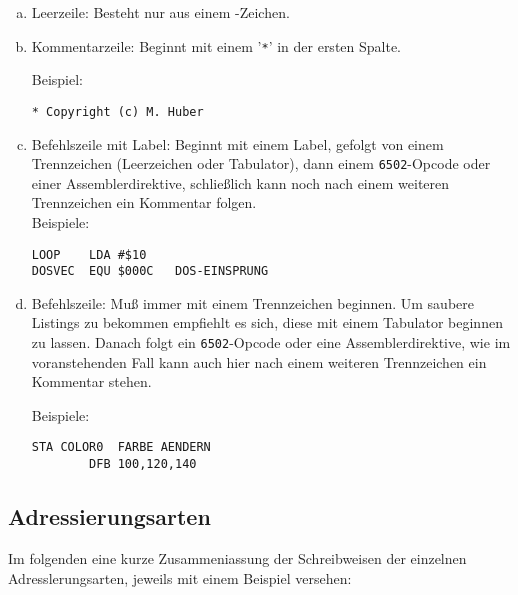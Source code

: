 \documentclass[10pt,a4paper,twoside,final,openright,titlepage]{memoir}
\newcommand{\key}[1]{\keystroke{\tiny #1}}
\begin{document}
\begin{enumerate}[a)]
\item Leerzeile: Besteht nur aus einem \key{RETURN}-Zeichen.

\item Kommentarzeile: Beginnt mit einem '\texttt{*}' in der ersten Spalte.

Beispiel:
\begin{Verbatim}
* Copyright (c) M. Huber
\end{Verbatim}

\item Befehlszeile mit Label: Beginnt mit einem Label, gefolgt von einem Trennzeichen (Leerzeichen oder Tabulator), dann einem
\texttt{6502}-Opcode oder einer Assemblerdirektive, schließlich
kann noch nach einem weiteren Trennzeichen ein
Kommentar folgen. \\

Beispiele:
\begin{Verbatim}[samepage=true]
LOOP    LDA #$10
DOSVEC  EQU $000C	DOS-EINSPRUNG
\end{Verbatim}

\item Befehlszeile: Muß immer mit einem Trennzeichen beginnen. Um saubere
Listings zu bekommen empfiehlt es sich, diese mit
einem Tabulator beginnen zu lassen. Danach folgt ein
\texttt{6502}-Opcode oder eine Assemblerdirektive, wie im
voranstehenden Fall kann auch hier nach einem weiteren
Trennzeichen ein Kommentar stehen.

Beispiele:
\begin{Verbatim}[samepage=true]
        STA COLOR0 	FARBE AENDERN
        DFB 100,120,140
\end{Verbatim}
\end{enumerate}

\subsection{Adressierungsarten}

Im folgenden eine kurze Zusammeniassung der Schreibweisen der einzelnen Adresslerungsarten, jeweils mit
einem Beispiel versehen:
\bigskip
\end{document}
